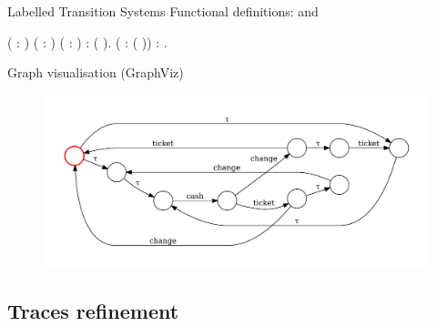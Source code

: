 \documentclass[t]{beamer}
\begin{document}
\begin{frame}{Labelled Transition Systems}
	Functional definitions:  and 
	\vskip 0.1in
	\begin{coqdoccode}
		\small
		\coqdocnoindent
		 \coqdoceol
		\coqdocindent{1.00em}
		( : ) ( : ) ( : ) :  ( ).\coqdoceol
		\coqdocemptyline
		\coqdocnoindent
		  ( :  ( )) : .\coqdoceol
	\end{coqdoccode}
	\vskip 0.2in
	Graph visualisation (GraphViz)
	\vskip -0.2in
	\begin{figure}
		\includegraphics[scale=0.35]{figures/MACHINE_LTS.pdf}
	\end{figure}
\end{frame}

\subsection{Traces refinement}
\end{document}
